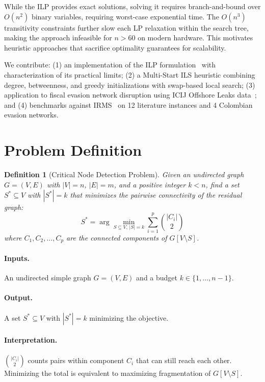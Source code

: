 \documentclass[11pt,a4paper]{article}
\newtheorem{definition}{Definition}
\begin{document}
While the ILP provides exact solutions, solving it requires branch-and-bound over $O(n^2)$ binary variables, requiring worst-case exponential time. The $O(n^3)$ transitivity constraints further slow each LP relaxation within the search tree, making the approach infeasible for $n > 60$ on modern hardware. This motivates heuristic approaches that sacrifice optimality guarantees for scalability.

We contribute: (1) an implementation of the ILP formulation~\cite{arulselvan2009} with characterization of its practical limits; (2) a Multi-Start ILS heuristic combining degree, betweenness, and greedy initializations with swap-based local search; (3) application to fiscal evasion network disruption using ICIJ Offshore Leaks data~\cite{icij2021}; and (4) benchmarks against IRMS~\cite{zhou2023} on 12 literature instances and 4 Colombian evasion networks.

\section{Problem Definition}
\label{sec:problem}

\begin{definition}[Critical Node Detection Problem]
Given an undirected graph $G = (V, E)$ with $|V| = n$, $|E| = m$, and a positive integer $k < n$, find a set $S^* \subseteq V$ with $|S^*| = k$ that minimizes the pairwise connectivity of the residual graph:
\begin{equation}
    S^* = \arg\min_{S \subseteq V,\, |S|=k} \sum_{i=1}^{p} \binom{|C_i|}{2}
    \label{eq:objective}
\end{equation}
where $C_1, C_2, \ldots, C_p$ are the connected components of $G[V \setminus S]$.
\end{definition}

\paragraph{Inputs.} An undirected simple graph $G = (V, E)$ and a budget $k \in \{1, \ldots, n-1\}$.

\paragraph{Output.} A set $S^* \subseteq V$ with $|S^*| = k$ minimizing the objective.

\paragraph{Interpretation.} $\binom{|C_i|}{2}$ counts pairs within component $C_i$ that can still reach each other. Minimizing the total is equivalent to maximizing fragmentation of $G[V \setminus S]$.
\end{document}
